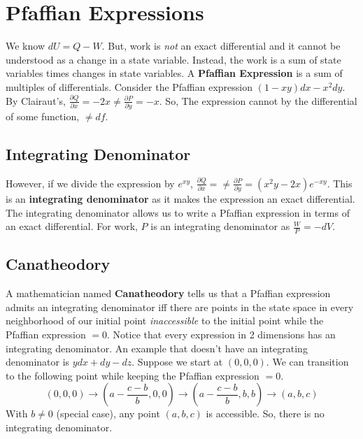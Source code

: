 \documentclass[../main.tex]{subfiles}
\begin{document}
\section{Pfaffian Expressions}
We know $dU=Q-W$. But, work is {\it not} an exact differential and it cannot be understood as a change in a
state variable. Instead, the work is a sum of state variables times changes in state variables. 
A \textbf{Pfaffian Expression} is a sum of multiples of differentials. Consider the Pfaffian expression
$(1-xy)dx-x^{2}dy$. By Clairaut's, $\frac{\partial Q}{\partial x}=-2x\neq\frac{\partial P}{\partial y}=-x$. So,
The expression cannot by the differential of some function, $\neq df$.

\subsection{Integrating Denominator}
However, if we divide the expression by
$e^{xy}$, $\frac{\partial Q}{\partial x}=\neq\frac{\partial P}{\partial y}=(x^{2}y-2x)e^{-xy}$. This is an
\textbf{integrating denominator} as it makes the expression an exact differential.
The integrating denominator allows us to write a Pfaffian expression in terms of an exact differential. For work,
$P$ is an integrating denominator as $\frac{W}{P}=-dV$. 

\subsection{Canatheodory}
A mathematician named \textbf{Canatheodory} tells us
that a Pfaffian expression admits an integrating denominator iff there are points in the state space in
every neighborhood of our initial point {\it inaccessible} to the initial point while the Pfaffian expression $= 0$.
Notice that every expression in 2 dimensions has an integrating denominator. An example that doesn't have an
integrating denominator is $ydx+dy-dz$. Suppose we start at $(0,0,0)$. We can transition to the following point 
while keeping the Pfaffian expression $=0$.
$$(0,0,0)\rightarrow (a-\frac{c-b}{b},0,0)\rightarrow (a-\frac{c-b}{b},b,b)\rightarrow (a,b,c)$$
With $b\neq 0$ (special case), any point $(a,b,c)$ is accessible. So, there is no integrating denominator.
\end{document}
